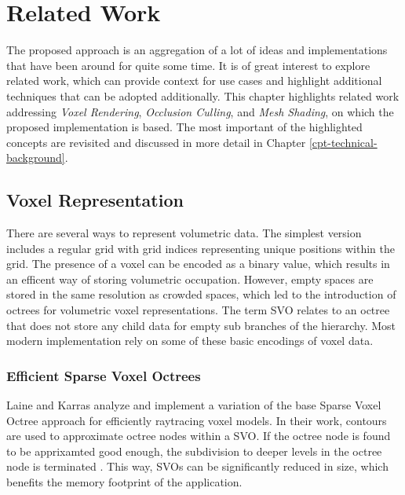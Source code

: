 \chapter{Related Work} \label{cpt-related-work}

The proposed approach is an aggregation of a lot of ideas and implementations that have been 
around for quite some time. It is of great interest to explore related work, which can provide 
context for use cases and highlight additional techniques that can be adopted additionally. 
This chapter highlights related work addressing \emph{Voxel Rendering}, \emph{Occlusion Culling}, 
and \emph{Mesh Shading}, on which the proposed implementation is based. The most important of 
the highlighted concepts are revisited and discussed in more detail in Chapter 
\ref{cpt-technical-background}. 


\section{Voxel Representation} \label{sec-voxel-representation}

There are several ways to represent volumetric data. The simplest version includes a regular 
grid with grid indices representing unique positions within the grid. The presence of a voxel 
can be encoded as a binary value, which results in an efficent way of storing volumetric occupation.
However, empty spaces are stored in the same resolution as crowded spaces, which led to the 
introduction of octrees for volumetric voxel representations. The term \ac{SVO} relates to an 
octree that does not store any child data for empty sub branches of the hierarchy. Most modern 
implementation rely on some of these basic encodings of voxel data.  


\subsection*{Efficient Sparse Voxel Octrees}

Laine and Karras \cite{Laine2010} analyze and implement a variation of the base Sparse Voxel Octree approach for 
efficiently raytracing voxel models. In their work, contours are used to approximate octree nodes within a \ac{SVO}. If the 
octree node is found to be apprixamted good enough, the subdivision to deeper levels in the octree node is terminated
\cite{Kampe2013,Laine2010}. This way, \ac{SVO}s can be significantly reduced in size, which benefits the memory 
footprint of the application. \\

